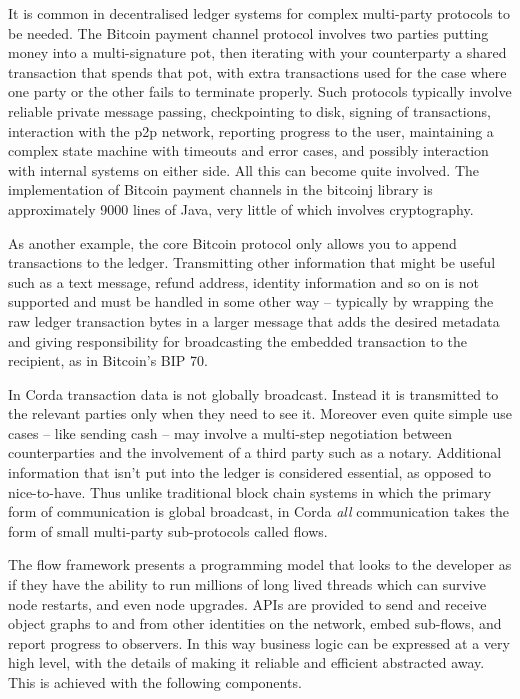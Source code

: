 \documentclass{article}
\begin{document}
It is common in decentralised ledger systems for complex multi-party protocols to be needed. The Bitcoin payment channel
protocol\cite{PaymentChannels} involves two parties putting money into a multi-signature pot, then iterating with your
counterparty a shared transaction that spends that pot, with extra transactions used for the case where one party or the
other fails to terminate properly. Such protocols typically involve reliable private message passing, checkpointing to
disk, signing of transactions, interaction with the p2p network, reporting progress to the user, maintaining a complex
state machine with timeouts and error cases, and possibly interaction with internal systems on either side. All
this can become quite involved. The implementation of Bitcoin payment channels in the bitcoinj library is approximately
9000 lines of Java, very little of which involves cryptography.

As another example, the core Bitcoin protocol only allows you to append transactions to the ledger. Transmitting other
information that might be useful such as a text message, refund address, identity information and so on is not supported
and must be handled in some other way -- typically by wrapping the raw ledger transaction bytes in a larger message that
adds the desired metadata and giving responsibility for broadcasting the embedded transaction to the recipient, as in
Bitcoin's BIP 70\cite{BIP70}.

In Corda transaction data is not globally broadcast. Instead it is transmitted to the relevant parties only when they
need to see it. Moreover even quite simple use cases -- like sending cash -- may involve a multi-step negotiation between
counterparties and the involvement of a third party such as a notary. Additional information that isn't put into the
ledger is considered essential, as opposed to nice-to-have. Thus unlike traditional block chain systems in which the primary
form of communication is global broadcast, in Corda \emph{all} communication takes the form of small multi-party sub-protocols
called flows.

The flow framework presents a programming model that looks to the developer as if they have the ability to run millions
of long lived threads which can survive node restarts, and even node upgrades. APIs are provided to send and receive
object graphs to and from other identities on the network, embed sub-flows, and report progress to observers. In this
way business logic can be expressed at a very high level, with the details of making it reliable and efficient
abstracted away. This is achieved with the following components.
\end{document}
